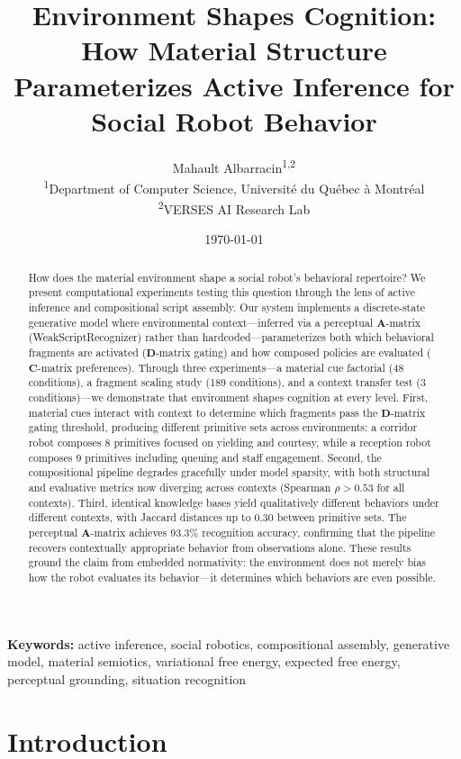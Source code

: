 \documentclass[11pt,a4paper]{article}
\title{Environment Shapes Cognition: How Material Structure Parameterizes Active Inference for Social Robot Behavior}
\author{%
  Mahault Albarracin\textsuperscript{1,2}
  \\[6pt]
  \textsuperscript{1}Department of Computer Science, Universit\'e du Qu\'ebec \`a Montr\'eal \\
  \textsuperscript{2}VERSES AI Research Lab
}
\date{\today}
\newcommand{\A}{\mathbf{A}}
\newcommand{\CC}{\mathbf{C}}
\newcommand{\D}{\mathbf{D}}
\begin{document}
\maketitle

\begin{abstract}
How does the material environment shape a social robot's behavioral repertoire?  We present computational experiments testing this question through the lens of active inference and compositional script assembly.  Our system implements a discrete-state generative model where environmental context---inferred via a perceptual $\A$-matrix (WeakScriptRecognizer) rather than hardcoded---parameterizes both which behavioral fragments are activated ($\D$-matrix gating) and how composed policies are evaluated ($\CC$-matrix preferences).  Through three experiments---a material cue factorial (48 conditions), a fragment scaling study (189 conditions), and a context transfer test (3 conditions)---we demonstrate that environment shapes cognition at every level.  First, material cues interact with context to determine which fragments pass the $\D$-matrix gating threshold, producing different primitive sets across environments: a corridor robot composes 8 primitives focused on yielding and courtesy, while a reception robot composes 9 primitives including queuing and staff engagement.  Second, the compositional pipeline degrades gracefully under model sparsity, with both structural and evaluative metrics now diverging across contexts (Spearman $\rho > 0.53$ for all contexts).  Third, identical knowledge bases yield qualitatively different behaviors under different contexts, with Jaccard distances up to 0.30 between primitive sets.  The perceptual $\A$-matrix achieves 93.3\% recognition accuracy, confirming that the pipeline recovers contextually appropriate behavior from observations alone.  These results ground the claim from embedded normativity: the environment does not merely bias how the robot evaluates its behavior---it determines which behaviors are even possible.
\end{abstract}

\noindent\textbf{Keywords:} active inference, social robotics, compositional assembly, generative model, material semiotics, variational free energy, expected free energy, perceptual grounding, situation recognition


\section{Introduction}
\label{sec:introduction}
\end{document}

